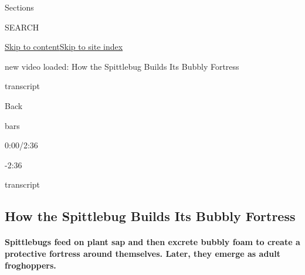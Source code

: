 Sections

SEARCH

\protect\hyperlink{site-content}{Skip to
content}\protect\hyperlink{site-index}{Skip to site index}

new video loaded: How the Spittlebug Builds Its Bubbly Fortress

transcript

Back

bars

0:00/2:36

-2:36

transcript

\hypertarget{how-the-spittlebug-builds-its-bubbly-fortress}{%
\subsection{How the Spittlebug Builds Its Bubbly
Fortress}\label{how-the-spittlebug-builds-its-bubbly-fortress}}

\hypertarget{spittlebugs-feed-on-plant-sap-and-then-excrete-bubbly-foam-to-create-a-protective-fortress-around-themselves-later-they-emerge-as-adult-froghoppers}{%
\paragraph{Spittlebugs feed on plant sap and then excrete bubbly foam to
create a protective fortress around themselves. Later, they emerge as
adult
froghoppers.}\label{spittlebugs-feed-on-plant-sap-and-then-excrete-bubbly-foam-to-create-a-protective-fortress-around-themselves-later-they-emerge-as-adult-froghoppers}}

